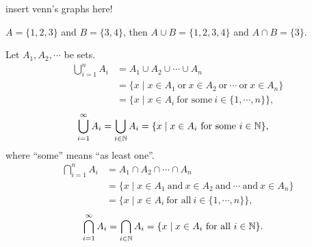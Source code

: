 

 {\color{red} insert venn's graphs here!} 

  \begin{example}
    $A = \{1, 2, 3\}$ and $B = \{3, 4\}$, then $A\cup B = \{1, 2, 3, 4\}$ and
    $A\cap B = \{3\}$.
  \end{example}
  
  \begin{definition}
    Let $A_1, A_2, \cdots$ be sets.
    \begin{align*}
      \bigcup_{i=1}^n A_i & = A_1\cup A_2\cup\cdots\cup A_n\\
      & = \{x\mid x\in
        A_1~\text{or}~x\in A_2~\text{or}~\cdots~\text{or}~x\in A_n\}\\
                          & = \{x\mid x\in A_i~\text{for some}~i\in \{1, \cdots,n\}\},
    \end{align*}
    \begin{align*}
      \bigcup_{i=1}^\infty A_i & = \bigcup_{i\in \mathbb{N}} A_i = \{x\mid x\in A_i~\text{for some}~i \in \mathbb{N}\},
    \end{align*}
    where ``some'' means ``as least one''.
    \begin{align*}
          \bigcap_{i=1}^n A_i & =A_1\cap A_2\cap\cdots\cap A_n\\
      & = \{x\mid x\in
        A_1~\text{and}~x\in A_2~\text{and}~\cdots~\text{and}~x\in A_n\}\\
                          & = \{x\mid x\in A_i~\text{for all}~i\in \{1, \cdots,n\}\},
    \end{align*}
    \begin{align*}
      \bigcap_{i=1}^\infty A_i & = \bigcap_{i\in \mathbb{N}} A_i = \{x\mid x\in A_i~\text{for all}~i \in \mathbb{N}\}.
    \end{align*}
  \end{definition}

